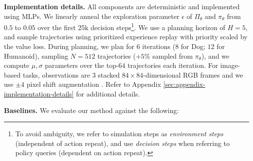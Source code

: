 \documentclass{article}
\begin{document}
\textbf{Implementation details.} All components are deterministic and implemented using MLPs. We linearly anneal the exploration parameter $\epsilon$ of $\Pi_{\theta}$ and $\pi_{\theta}$ from $0.5$ to $0.05$ over the first 25k decision steps\footnote{To avoid ambiguity, we refer to simulation steps as \textit{environment steps} (independent of action repeat), and use \textit{decision steps} when referring to policy queries (dependent on action repeat).}. We use a planning horizon of $H=5$, and sample trajectories using prioritized experience replay \citep{Schaul2016PrioritizedER} with priority scaled by the value loss. During planning, we plan for $6$ iterations ($8$ for Dog; $12$ for Humanoid), sampling $N=512$ trajectories ($+5\%$ sampled from $\pi_{\theta}$), and we compute $\mu,\sigma$ parameters over the top-$64$ trajectories each iteration. For image-based tasks, observations are 3 stacked $84\times 84$-dimensional RGB frames and we use $\pm4$ pixel shift augmentation \citep{kostrikov2020image}. Refer to Appendix \ref{sec:appendix-implementation-details} for additional details.

\textbf{Baselines.} We evaluate our method against the following:
\end{document}
